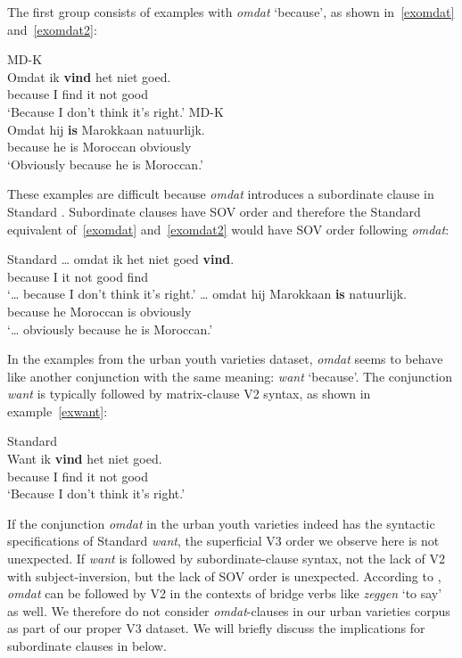 \documentclass[output=paper]{langsci/langscibook}
\begin{document}
The first group consists of examples with \emph{omdat} `because', as shown
in~\eqref{exomdat} and~\eqref{exomdat2}:

\ea
    \ea MD-K\\
    \gll\label{exomdat}Omdat ik \textbf{vind} het niet goed.\\
    because I find it not good\\
    \trans \enquote*{Because I don't think it's right.}
    \ex MD-K\\
    \gll\label{exomdat2}Omdat hij \textbf{is} Marokkaan natuurlijk.\\
    because he is Moroccan obviously\\
    \trans \enquote*{Obviously because he is Moroccan.}
    \z
\z

\noindent These examples are difficult because \emph{omdat} introduces a
subordinate clause in Standard . Subordinate clauses have SOV order and
therefore the Standard  equivalent of~\eqref{exomdat} and~\eqref{exomdat2}
would have SOV order following \emph{omdat}:

\ea Standard 
    \ea
    \gll \dots{} omdat ik het niet goed \textbf{vind}.\\
    {} because I it not good find\\
    \trans \enquote*{\dots{} because I don't think it's right.}
    \ex
    \gll \dots{} omdat hij Marokkaan \textbf{is} natuurlijk.\\
    {} because he Moroccan is obviously\\
    \trans \enquote*{\dots{} obviously because he is Moroccan.}
    \z
\z

\noindent In the examples from the  urban youth varieties dataset,
\emph{omdat} seems to behave like another  conjunction with the same
meaning: \emph{want} `because'. The conjunction \emph{want} is typically
followed by matrix-clause V2 syntax, as shown in example~\eqref{exwant}:

\ea Standard \\
    \gll\label{exwant}Want ik \textbf{vind} het niet goed.\\
    because I find it not good\\
    \trans \enquote*{Because I don't think it's right.}
\z

\noindent If the conjunction \emph{omdat} in the  urban youth varieties
indeed has the syntactic specifications of Standard  \emph{want}, the
superficial V3 order we observe here is not unexpected. If \emph{want} is
followed by subordinate-clause syntax, not the lack of V2 with
subject-inversion, but the lack of SOV order is unexpected. According to
\citet[123--125]{Zwart:2011}, \emph{omdat} can be followed by V2 in the
contexts of bridge verbs like \emph{zeggen} `to say' as well. We therefore do
not consider \emph{omdat}-clauses in our urban varieties corpus as part of
our proper V3 dataset. We will briefly discuss the implications for subordinate
clauses in  below.
\end{document}
